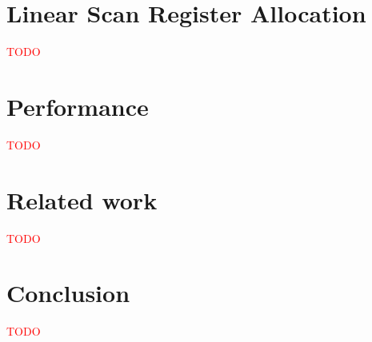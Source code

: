\documentclass[10pt,a4paper,final,twocolumn]{article}
\begin{document}
\section{Linear Scan Register Allocation} \label{section:Linear_Scan_Register_Allocation}

\textcolor{red}{TODO}


\section{Performance} \label{section:Performance}

\textcolor{red}{TODO}


\section{Related work} \label{section:Related_work}

\textcolor{red}{TODO}


\section{Conclusion} \label{section:Conclusion}

\textcolor{red}{TODO}




\end{document}
